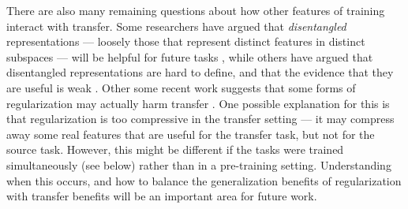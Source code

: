 There are also many remaining questions about how other features of training interact with transfer. Some researchers have argued that \emph{disentangled} representations --- loosely those that represent distinct features in distinct subspaces --- will be helpful for future tasks \citep{Higgins2018}, while others have argued that disentangled representations are hard to define, and that the evidence that they are useful is weak \citep{Locatello2019}. Other some recent work suggests that some forms of regularization may actually harm transfer \citep{Kornblith2019}. One possible explanation for this is that regularization is too compressive in the transfer setting --- it may compress away some real features that are useful for the transfer task, but not for the source task. However, this might be different if the tasks were trained simultaneously (see below) rather than in a pre-training setting. Understanding when this occurs, and how to balance the generalization benefits of regularization with transfer benefits will be an important area for future work. \par


